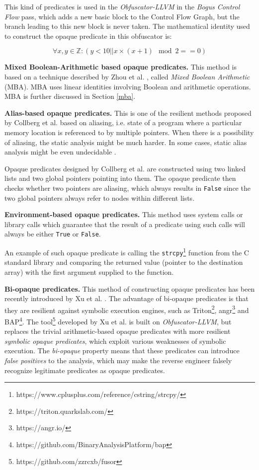 \documentclass[
  digital, %
  table,   %
  twoside, %
  nolof,     %
  nolot,     %
]{fithesis3}
\theoremstyle{definition}
\begin{document}
This kind of predicates is used in the \textit{Obfuscator-LLVM} in the \textit{Bogus Control Flow} pass, which adds a new basic block to the Control Flow Graph, but the branch leading to this new block is never taken. The mathematical identity used to construct the opaque predicate in this obfuscator is:

\begin{equation}
    \forall x, y \in \mathbb{Z}: (y < 10 || x \times (x + 1) \mod 2 == 0)
\end{equation}

\textbf{Mixed Boolean-Arithmetic based opaque predicates.} This method is based on a technique described by Zhou et al. \cite{mba_zhou}, called \textit{Mixed Boolean Arithmetic} (MBA). 
MBA uses linear identities involving Boolean and arithmetic operations. MBA is further discussed in Section \ref{mba}.

\textbf{Alias-based opaque predicates.} This is one of the resilient methods proposed by Collberg et al. \cite{manufacturing_opaque} based on aliasing, i.e. state of a program where a particular memory location is referenced to by multiple pointers. When there is a possibility of aliasing, the static analysis might be much harder. In some cases, static alias analysis might be even undecidable \cite{aliasing_hard}.

Opaque predicates designed by Collberg et al. are constructed using two linked lists and two global pointers pointing into them. The opaque predicate then checks whether two pointers are aliasing, which always results in \texttt{False} since the two global pointers always refer to nodes within different lists. 

\textbf{Environment-based opaque predicates.}
This method uses system calls or library calls which guarantee that the result of a predicate using such calls will always be either \texttt{True} or \texttt{False}. 

An example of such opaque predicate is calling the \texttt{strcpy}\footnote{https://www.cplusplus.com/reference/cstring/strcpy/} function from the C standard library and comparing the returned value (pointer to the destination array) with the first argument supplied to the function.

\textbf{Bi-opaque predicates.} This method of constructing opaque predicates has been recently introduced by Xu et al. \cite{bi_opaque}. The advantage of bi-opaque predicates is that they are resilient against symbolic execution engines, such as Triton\footnote{https://triton.quarkslab.com/}, angr\footnote{https://angr.io/} and BAP\footnote{https://github.com/BinaryAnalysisPlatform/bap}. The tool\footnote{https://github.com/zzrcxb/fusor} developed by Xu et al. is built on \textit{Obfuscator-LLVM}, but replaces the trivial arithmetic-based opaque predicates with more resilient \textit{symbolic opaque predicates}, which exploit various weaknesses of symbolic execution. The \textit{bi-opaque} property means that these predicates can introduce \textit{false positives} to the analysis, which may make the reverse engineer falsely recognize legitimate predicates as opaque predicates.
\end{document}

